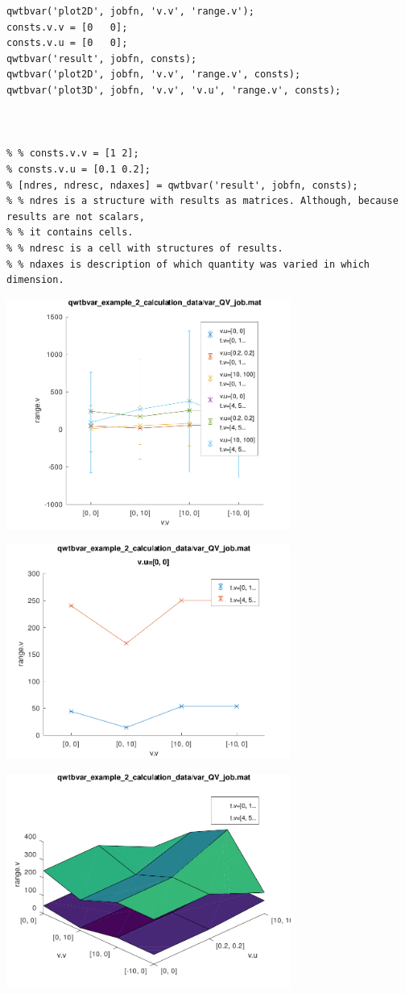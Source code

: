 \begin{lstlisting}
qwtbvar('plot2D', jobfn, 'v.v', 'range.v');
consts.v.v = [0   0];
consts.v.u = [0   0];
qwtbvar('result', jobfn, consts);
qwtbvar('plot2D', jobfn, 'v.v', 'range.v', consts);
qwtbvar('plot3D', jobfn, 'v.v', 'v.u', 'range.v', consts);



% % consts.v.v = [1 2];
% consts.v.u = [0.1 0.2];
% [ndres, ndresc, ndaxes] = qwtbvar('result', jobfn, consts);
% % ndres is a structure with results as matrices. Although, because results are not scalars,
% % it contains cells.
% % ndresc is a cell with structures of results.
% % ndaxes is description of which quantity was varied in which dimension.
\end{lstlisting}
\begin{center}
\includegraphics[width=0.7\textwidth]{qwtb_examples_published/qwtbvar_example_2-1.pdf}
\end{center}
\begin{center}
\includegraphics[width=0.7\textwidth]{qwtb_examples_published/qwtbvar_example_2-2.pdf}
\end{center}
\begin{center}
\includegraphics[width=0.7\textwidth]{qwtb_examples_published/qwtbvar_example_2-3.pdf}
\end{center}


\stopcontents[localtoc]
